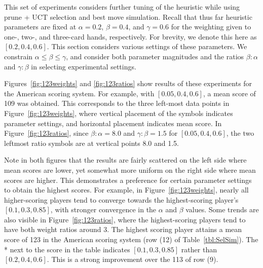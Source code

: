 \documentclass[letterpaper]{article}
\begin{document}
This set of experiments considers further tuning of the heuristic while using prune + UCT selection and best move simulation. Recall that thus far heuristic parameters are fixed at $\alpha = 0.2$, $\beta = 0.4$, and $\gamma = 0.6$ for the weighting given to one-, two-, and three-card hands, respectively. For brevity, we denote this here as $[0.2, 0.4, 0.6]$. This section considers various settings of these parameters. We constrain $\alpha \leq \beta \leq \gamma$, and consider both parameter magnitudes and the ratios $\beta : \alpha$ and $\gamma : \beta$ in selecting experimental settings.


Figures~\ref{fig:123weights} and \ref{fig:123ratios} show results of these experiments for the American scoring system. For example, with $[0.05, 0.4, 0.6]$, a mean score of 109 was obtained. This corresponds to the three left-most data points in Figure~\ref{fig:123weights}, where vertical placement of the symbols indicates parameter settings, and horizontal placement indicates mean score. In Figure~\ref{fig:123ratios}, since $\beta:\alpha = 8.0$ and $\gamma:\beta = 1.5$ for $[0.05, 0.4, 0.6]$, the two leftmost ratio symbols are at vertical points 8.0 and 1.5.

Note in both figures that the results are fairly scattered on the left side where mean scores are lower, yet somewhat more uniform on the right side where mean scores are higher. This demonstrates a preference for certain parameter settings to obtain the highest scores. For example, in Figure~\ref{fig:123weights}, nearly all higher-scoring players tend to converge towards the highest-scoring player's $[0.1, 0.3, 0.85]$, with stronger convergence in the $\alpha$ and $\beta$ values. Some trends are also visible in Figure~\ref{fig:123ratios}, where the highest-scoring players tend to have both weight ratios around 3. The highest scoring player attains a mean score of 123 in the American scoring system (row (12) of Table~\ref{tbl:SelSim}). The \mbox{*} next to the score in the table indicates $[0.1, 0.3, 0.85]$ rather than $[0.2, 0.4, 0.6]$. This is a strong improvement over the 113 of row (9).
\end{document}
